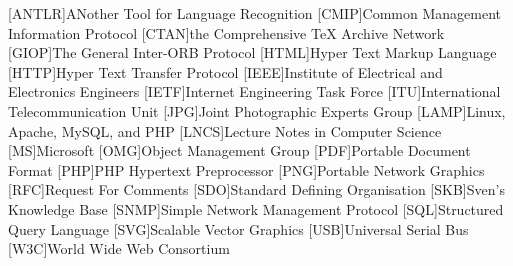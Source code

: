 
\begin{acronym}[ANTLR]
    [ANTLR]{ANother Tool for Language Recognition}
    [CMIP]{Common Management Information Protocol}
    [CTAN]{the Comprehensive TeX Archive Network}
    [GIOP]{The General Inter-ORB Protocol}
    [HTML]{Hyper Text Markup Language}
    [HTTP]{Hyper Text Transfer Protocol}
    [IEEE]{Institute of Electrical and Electronics Engineers}
    [IETF]{Internet Engineering Task Force}
    [ITU]{International Telecommunication Unit}
    [JPG]{Joint Photographic Experts Group}
    [LAMP]{Linux, Apache, MySQL, and PHP}
    [LNCS]{Lecture Notes in Computer Science}
    [MS]{Microsoft}
    [OMG]{Object Management Group}
    [PDF]{Portable Document Format}
    [PHP]{PHP Hypertext Preprocessor}
    [PNG]{Portable Network Graphics}
    [RFC]{Request For Comments}
    [SDO]{Standard Defining Organisation}
    [SKB]{Sven's Knowledge Base}
    [SNMP]{Simple Network Management Protocol}
    [SQL]{Structured Query Language}
    [SVG]{Scalable Vector Graphics}
    [USB]{Universal Serial Bus}
    [W3C]{World Wide Web Consortium}
\end{acronym}
